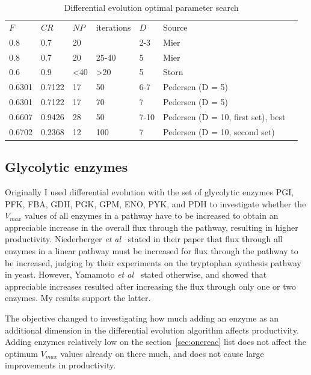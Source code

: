 \documentclass[parskip=full]{scrreprt}
\begin{document}
\begin{table}[htbp]
  \caption{Differential evolution optimal parameter search}
  \label{tab:deoptimise}
  \centering
  \begin{tabularx}{\linewidth}{LLLLLLL}
    $F$ & $CR$ & $NP$ & iterations & $D$ & Source\\
    0.8 & 0.7 & 20 & & 2-3 & Mier\\
    0.8 & 0.7 & 20 & 25-40 & 5 & Mier\\
    0.6 & 0.9 & \textless 40 & \textgreater 20 & 5 & Storn\\
    0.6301 & 0.7122 & 17 & 50 & 6-7 & Pedersen (D = 5)\\
    0.6301 & 0.7122 & 17 & 70 & 7 & Pedersen (D = 5)\\
    0.6607 & 0.9426 & 28 & 50 & 7-10 & Pedersen (D = 10, first set), best\\
    0.6702 & 0.2368 & 12 & 100 & 7 & Pedersen (D = 10, second set)\\
  \end{tabularx}
\end{table}

\subsection{Glycolytic enzymes}
\label{ssec:glycolytic}

Originally I used differential evolution with the set of glycolytic enzymes PGI, PFK, FBA, GDH, PGK, GPM, ENO, PYK, and PDH to investigate whether the $V_{max}$ values of all enzymes in a pathway have to be increased to obtain an appreciable increase in the overall flux through the pathway, resulting in higher productivity. Niederberger \emph{et al}~\cite{niederberger_strategy_1992} stated in their paper that flux through all enzymes in a linear pathway must be increased for flux through the pathway to be increased, judging by their experiments on the tryptophan synthesis pathway in yeast. However, Yamamoto \emph{et al}~\cite{yamamoto_overexpression_2012} stated otherwise, and showed that appreciable increases resulted after increasing the flux through only one or two enzymes. My results support the latter.

The objective changed to investigating how much adding an enzyme as an additional dimension in the differential evolution algorithm affects productivity. Adding enzymes relatively low on the section~\ref{sec:onereac} list does not affect the optimum $V_{max}$ values already on there much, and does not cause large improvements in productivity.
\end{document}
